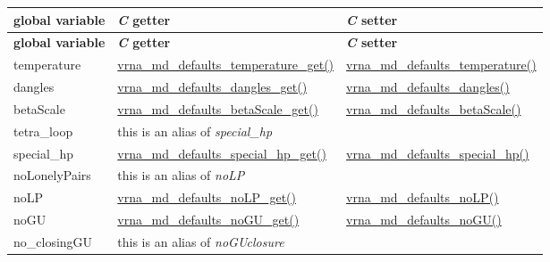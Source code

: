 \begin{DoxyRefList}
\tabulinesep=1mm
\begin{longtabu} spread 0pt [c]{*{3}{|X[-1]}|}
\hline
\rowcolor{\tableheadbgcolor}\textbf{ global variable }&\textbf{ {\itshape C} getter }&\textbf{ {\itshape C} setter  }\\
\endfirsthead
\hline
\endfoot
\hline
\rowcolor{\tableheadbgcolor}\textbf{ global variable }&\textbf{ {\itshape C} getter }&\textbf{ {\itshape C} setter  }\\
\endhead
temperature &\hyperlink{group__model__details_ga96b24a74437f9ba46c4e06343155bf46}{vrna\+\_\+md\+\_\+defaults\+\_\+temperature\+\_\+get()} &\hyperlink{group__model__details_gaf9e527e9a2f7e6fd6e42bc6e602f5445}{vrna\+\_\+md\+\_\+defaults\+\_\+temperature()} \\
dangles &\hyperlink{group__model__details_ga67ca06f95ae133778c79a4493c9817b8}{vrna\+\_\+md\+\_\+defaults\+\_\+dangles\+\_\+get()} &\hyperlink{group__model__details_gac76a5374def8e5e4e644ff6e4cc72dee}{vrna\+\_\+md\+\_\+defaults\+\_\+dangles()} \\
beta\+Scale &\hyperlink{group__model__details_gabb8780f5410c52f970d75b044059bd09}{vrna\+\_\+md\+\_\+defaults\+\_\+beta\+Scale\+\_\+get()} &\hyperlink{group__model__details_gae984567db36c3f9b8731ecc917abf3a2}{vrna\+\_\+md\+\_\+defaults\+\_\+beta\+Scale()} \\
tetra\+\_\+loop &this is an alias of {\itshape special\+\_\+hp} &\\
special\+\_\+hp &\hyperlink{group__model__details_ga1d68a6efdaa1253cc63fd9cd06452559}{vrna\+\_\+md\+\_\+defaults\+\_\+special\+\_\+hp\+\_\+get()} &\hyperlink{group__model__details_gafff6449a02744add0308e653230c15fc}{vrna\+\_\+md\+\_\+defaults\+\_\+special\+\_\+hp()} \\
no\+Lonely\+Pairs &this is an alias of {\itshape no\+LP} &\\
no\+LP &\hyperlink{group__model__details_ga934344888fbacaed538bbbfe910f2aa6}{vrna\+\_\+md\+\_\+defaults\+\_\+no\+L\+P\+\_\+get()} &\hyperlink{group__model__details_ga2f88ffc393ac9d7987849c965fd29ea8}{vrna\+\_\+md\+\_\+defaults\+\_\+no\+L\+P()} \\
no\+GU &\hyperlink{group__model__details_ga5faa7d4e536d7fe36ec25428c0cf2563}{vrna\+\_\+md\+\_\+defaults\+\_\+no\+G\+U\+\_\+get()} &\hyperlink{group__model__details_ga98218f85c7a957a1d1ddf4627fdf5a39}{vrna\+\_\+md\+\_\+defaults\+\_\+no\+G\+U()} \\
no\+\_\+closing\+GU &this is an alias of {\itshape no\+G\+Uclosure} &\\

\end{longtabu}
\end{DoxyRefList}
